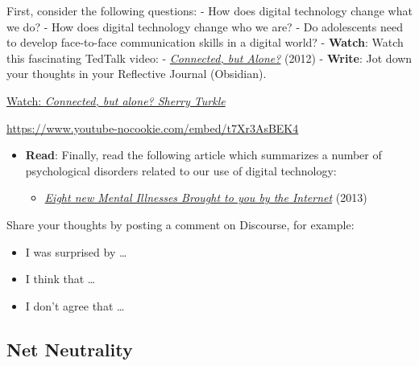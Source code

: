 \documentclass[
  letterpaper,
  DIV=11,
  numbers=noendperiod]{scrreprt}
\providecommand{\tightlist}{%
  \setlength{\itemsep}{0pt}\setlength{\parskip}{0pt}}\usepackage{longtable,booktabs,array}
\begin{document}
\begin{tcolorbox}[enhanced jigsaw, toprule=.15mm, colback=white, colframe=quarto-callout-note-color-frame, bottomtitle=1mm, leftrule=.75mm, coltitle=black, titlerule=0mm, rightrule=.15mm, colbacktitle=quarto-callout-note-color!10!white, left=2mm, title={Learning Activity}, opacitybacktitle=0.6, opacityback=0, breakable, toptitle=1mm, arc=.35mm, bottomrule=.15mm]

First, consider the following questions: - How does digital technology
change what we do? - How does digital technology change who we are? - Do
adolescents need to develop face-to-face communication skills in a
digital world? - \textbf{Watch}: Watch this fascinating TedTalk video: -
\href{https://www.youtube.com/watch?v=t7Xr3AsBEK4}{\emph{Connected, but
Alone?}} (2012) - \textbf{Write}: Jot down your thoughts in your
Reflective Journal (Obsidian).

\href{https://www.youtube.com/watch?v=t7Xr3AsBEK4}{Watch:
\emph{Connected, but alone? \textbar{} Sherry Turkle}}

\url{https://www.youtube-nocookie.com/embed/t7Xr3AsBEK4}

\begin{itemize}
\tightlist
\item
  \textbf{Read}: Finally, read the following article which summarizes a
  number of psychological disorders related to our use of digital
  technology:

  \begin{itemize}
  \tightlist
  \item
    \href{https://www.pcworld.com/article/448085/eight-new-mental-illnesses-brought-to-you-by-wait-for-it-the-internet.html}{\emph{Eight
    new Mental Illnesses Brought to you by the Internet}} (2013)
  \end{itemize}
\end{itemize}

Share your thoughts by posting a comment on Discourse, for example:

\begin{itemize}
\tightlist
\item
  I was surprised by \ldots{}
\item
  I think that \ldots{}
\item
  I don't agree that \ldots{}
\end{itemize}

\end{tcolorbox}

\subsection*{Net Neutrality}\label{net-neutrality}
\end{document}
